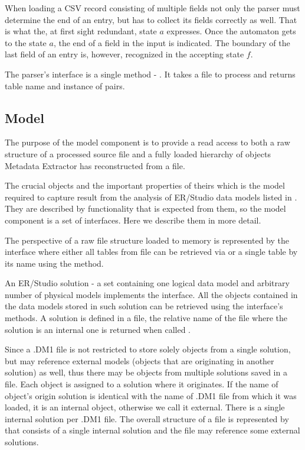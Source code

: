 When loading a CSV record consisting of multiple fields not only the parser must determine the end of an entry, but has to collect its fields correctly as well. That is what the, at first sight redundant, state $a$ expresses. Once the automaton gets to the state $a$, the end of a field in the input is indicated. 
The boundary of the last field of an entry is, however, recognized in the accepting state $f$.

The parser's interface is a single method - . It takes a file to process and returns table name and instance of  pairs.

\subsection{Model}

The purpose of the model component is to provide a read access to both a raw structure of a processed source file and a fully loaded hierarchy of objects Metadata Extractor has reconstructed from a file.

The crucial objects and the important properties of theirs which is the model required to capture result from the analysis of ER/Studio data models listed in . They are described by functionality that is expected from them, so the model component is a set of interfaces. Here we describe them in more detail.

The perspective of a raw file structure loaded to memory is represented by the interface  where either all tables from file can be retrieved via  or a single table by its name using the  method.

An ER/Studio solution - a set containing one logical data model and arbitrary number of physical models implements the  interface. All the objects contained in the data models stored in such solution can be retrieved using the interface's methods. A solution is defined in a file, the relative name of the file where the solution is an internal one is returned when called .

Since a .DM1 file is not restricted to store solely objects from a single solution, but may reference external models (objects that are originating in another solution) as well, thus there may be objects from multiple solutions saved in a file. Each object is assigned to a solution where it originates.
If the name of object's origin solution is identical with the name of .DM1 file from which it was loaded, it is an internal object, otherwise we call it external. There is a single internal solution per .DM1 file. 
The overall structure of a file is represented by  that consists of a single internal solution and the file may reference some external solutions.


